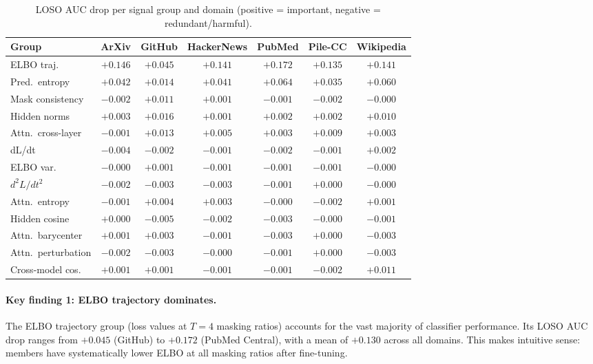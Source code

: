 \documentclass[11pt,a4paper]{article}
\begin{document}
\begin{table}[H]
\centering
\setlength{\tabcolsep}{3.5pt}
\caption{LOSO AUC drop per signal group and domain (positive = important, negative = redundant/harmful).}
\label{tab:loso}
\small
\begin{tabular}{lcccccc}
\toprule
\textbf{Group} & \textbf{ArXiv} & \textbf{GitHub} & \textbf{HackerNews} & \textbf{PubMed} & \textbf{Pile-CC} & \textbf{Wikipedia} \\
\midrule
ELBO traj.         & $+0.146$ & $+0.045$ & $+0.141$ & $+0.172$ & $+0.135$ & $+0.141$ \\
Pred.\ entropy     & $+0.042$ & $+0.014$ & $+0.041$ & $+0.064$ & $+0.035$ & $+0.060$ \\
Mask consistency   & $-0.002$ & $+0.011$ & $+0.001$ & $-0.001$ & $-0.002$ & $-0.000$ \\
Hidden norms       & $+0.003$ & $+0.016$ & $+0.001$ & $+0.002$ & $+0.002$ & $+0.010$ \\
Attn.\ cross-layer & $-0.001$ & $+0.013$ & $+0.005$ & $+0.003$ & $+0.009$ & $+0.003$ \\
dL/dt              & $-0.004$ & $-0.002$ & $-0.001$ & $-0.002$ & $-0.001$ & $+0.002$ \\
ELBO var.          & $-0.000$ & $+0.001$ & $-0.001$ & $-0.001$ & $-0.001$ & $-0.000$ \\
$d^2L/dt^2$        & $-0.002$ & $-0.003$ & $-0.003$ & $-0.001$ & $+0.000$ & $-0.000$ \\
Attn.\ entropy     & $-0.001$ & $+0.004$ & $+0.003$ & $-0.000$ & $-0.002$ & $+0.001$ \\
Hidden cosine      & $+0.000$ & $-0.005$ & $-0.002$ & $-0.003$ & $-0.000$ & $-0.001$ \\
Attn.\ barycenter  & $+0.001$ & $+0.003$ & $-0.001$ & $-0.003$ & $+0.000$ & $-0.003$ \\
Attn.\ perturbation & $-0.002$ & $-0.003$ & $-0.000$ & $-0.001$ & $+0.000$ & $-0.003$ \\
Cross-model cos.   & $+0.001$ & $+0.001$ & $-0.001$ & $-0.001$ & $-0.002$ & $+0.011$ \\
\bottomrule
\end{tabular}
\end{table}

\paragraph{Key finding 1: ELBO trajectory dominates.}
The ELBO trajectory group (loss values at $T=4$ masking ratios) accounts for
the vast majority of classifier performance. Its LOSO AUC drop ranges from
$+0.045$ (GitHub) to $+0.172$ (PubMed Central), with a mean of $+0.130$ across
all domains. This makes intuitive sense: members have systematically lower ELBO
at all masking ratios after fine-tuning.
\end{document}
